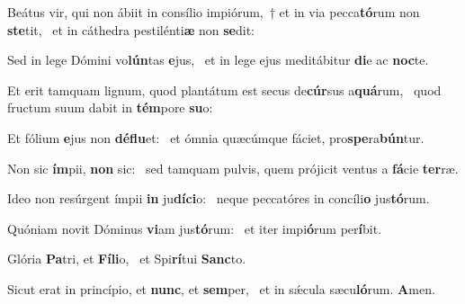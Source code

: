 \item Beátus vir, qui non ábiit in consílio impiórum,~† et in via pecca\textbf{tó}rum non \textbf{ste}tit,~\psstar{} et in cáthedra pestilénti\textbf{æ} non \textbf{se}dit:
\item Sed in lege Dómini vo\textbf{lún}tas \textbf{e}jus,~\psstar{} et in lege ejus meditábitur \textbf{di}e ac \textbf{noc}te.
\item Et erit tamquam lignum, quod plantátum est secus de\textbf{cúr}sus a\textbf{quá}rum,~\psstar{} quod fructum suum dabit in \textbf{tém}pore \textbf{su}o:
\item Et fólium \textbf{e}jus non \textbf{dé}\textbf{flu}et:~\psstar{} et ómnia quæcúmque fáciet, pro\textbf{spe}ra\textbf{bún}tur.
\item Non sic \textbf{ím}pii, \textbf{non} sic:~\psstar{} sed tamquam pulvis, quem prójicit ventus a \textbf{fá}cie \textbf{ter}ræ.
\item Ideo non resúrgent ímpii \textbf{in} ju\textbf{dí}\textbf{ci}o:~\psstar{} neque peccatóres in concíli\textbf{o} jus\textbf{tó}rum.
\item Quóniam novit Dóminus \textbf{vi}am jus\textbf{tó}rum:~\psstar{} et iter impi\textbf{ó}rum per\textbf{í}bit.
\item Glória \textbf{Pa}tri, et \textbf{Fí}\textbf{li}o,~\psstar{} et Spi\textbf{rí}tui \textbf{Sanc}to.
\item Sicut erat in princípio, et \textbf{nunc}, et \textbf{sem}per,~\psstar{} et in sǽcula sæcu\textbf{ló}rum. \textbf{A}men.
